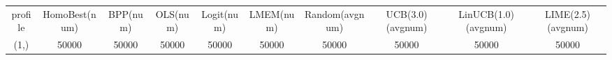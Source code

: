 \begin{tabular}{cccccccccc}
profile & HomoBest(num) & BPP(num) & OLS(num) & Logit(num) & LMEM(num) & Random(avgnum) & UCB(3.0)(avgnum) & LinUCB(1.0)(avgnum) & LIME(2.5)(avgnum)\\
(1,) & 50000 & 50000 & 50000 & 50000 & 50000 & 50000 & 50000 & 50000 & 50000\\
\end{tabular}
